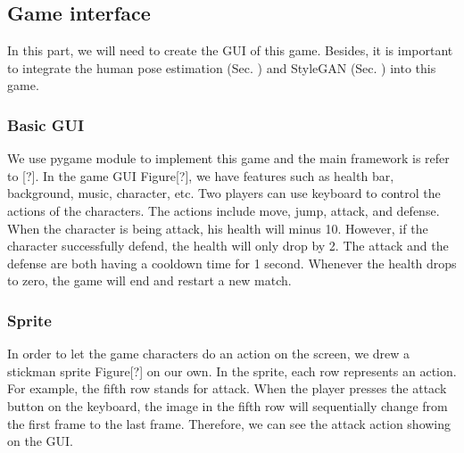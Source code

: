 \subsection{Game interface}

In this part, we will need to create the GUI of this game.
Besides, it is important to integrate the human pose estimation (Sec. ) and StyleGAN (Sec. ) into this game.



\subsubsection{Basic GUI}

We use pygame module to implement this game and the main framework is refer to [?]. In the game GUI Figure[?], we have features such as health bar, background, music, character, etc. Two players can use keyboard to control the actions of the characters. The actions include move, jump, attack, and defense. When the character is being attack, his health will minus 10. However, if the character successfully defend, the health will only drop by 2. The attack and the defense are both having a cooldown time for 1 second. Whenever the health drops to zero, the game will end and restart a new match.

\subsubsection{Sprite}

In order to let the game characters do an action on the screen, we drew a stickman sprite Figure[?] on our own. In the sprite, each row represents an action. For example, the fifth row stands for attack. When the player presses the attack button on the keyboard, the image in the fifth row will sequentially change from the first frame to the last frame. Therefore, we can see the attack action showing on the GUI.

